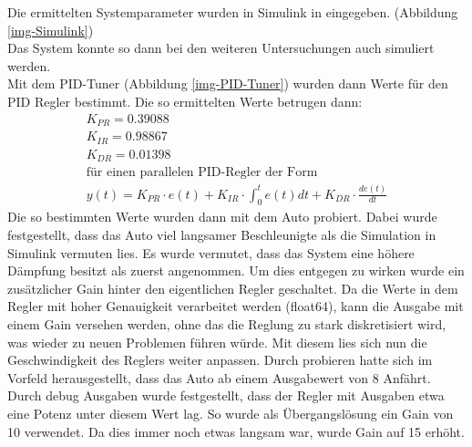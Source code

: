 \documentclass[a4paper,12pt]{report}
\begin{document}
	Die ermittelten Systemparameter wurden in Simulink in eingegeben. (Abbildung \ref{img-Simulink}) \\
	Das System konnte so dann bei den weiteren Untersuchungen auch simuliert werden. \\ 
	Mit dem PID-Tuner (Abbildung \ref{img-PID-Tuner}) wurden dann Werte für den PID Regler bestimmt. Die so ermittelten Werte betrugen dann: \\
	\begin{gather*}
		K_{PR} = 0.39088 \\
		K_{IR} = 0.98867 \\
		K_{DR} = 0.01398 \\
		\text{für einen parallelen PID-Regler der Form}\\
		y(t) = K_{PR} \cdot e(t) + K_{IR} \cdot \int_{0}^{t} e(t)dt + K_{DR} \cdot \frac{de(t)}{dt}
	\end{gather*}
	Die so bestimmten Werte wurden dann mit dem Auto probiert. Dabei wurde festgestellt, dass das Auto viel langsamer Beschleunigte als die Simulation in Simulink vermuten lies. Es wurde vermutet, dass das System eine höhere Dämpfung besitzt als zuerst angenommen. Um dies entgegen zu wirken wurde ein zusätzlicher Gain hinter den eigentlichen Regler geschaltet. Da die Werte in dem Regler mit hoher Genauigkeit verarbeitet werden (float64), kann die Ausgabe mit einem Gain versehen werden, ohne das die Reglung zu stark diskretisiert wird, was wieder zu neuen Problemen führen würde. Mit diesem lies sich nun die Geschwindigkeit des Reglers weiter anpassen. Durch probieren  hatte sich im Vorfeld herausgestellt, dass das Auto ab einem Ausgabewert von 8 Anfährt. Durch debug Ausgaben wurde festgestellt, dass der Regler mit Ausgaben etwa eine Potenz unter diesem Wert lag. So wurde als Übergangslösung ein Gain von 10 verwendet. Da dies immer noch etwas langsam war, wurde Gain auf 15 erhöht. \\
		
\end{document}
